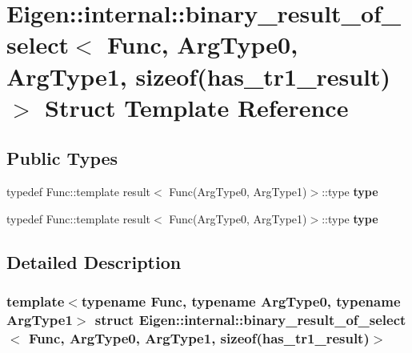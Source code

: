 \hypertarget{struct_eigen_1_1internal_1_1binary__result__of__select_3_01_func_00_01_arg_type0_00_01_arg_type19eb2d03c93e1465fabde3b560e3be1a4}{}\section{Eigen\+:\+:internal\+:\+:binary\+\_\+result\+\_\+of\+\_\+select$<$ Func, Arg\+Type0, Arg\+Type1, sizeof(has\+\_\+tr1\+\_\+result)$>$ Struct Template Reference}
\label{struct_eigen_1_1internal_1_1binary__result__of__select_3_01_func_00_01_arg_type0_00_01_arg_type19eb2d03c93e1465fabde3b560e3be1a4}
\subsection*{Public Types}
\begin{DoxyCompactItemize}
\item 
\mbox{\label{struct_eigen_1_1internal_1_1binary__result__of__select_3_01_func_00_01_arg_type0_00_01_arg_type19eb2d03c93e1465fabde3b560e3be1a4_a3e27d3266b9728c213c35a4e90f1a73d}} 
typedef Func\+::template result$<$ Func(Arg\+Type0, Arg\+Type1)$>$\+::type {\bfseries type}
\item 
\mbox{\label{struct_eigen_1_1internal_1_1binary__result__of__select_3_01_func_00_01_arg_type0_00_01_arg_type19eb2d03c93e1465fabde3b560e3be1a4_a3e27d3266b9728c213c35a4e90f1a73d}} 
typedef Func\+::template result$<$ Func(Arg\+Type0, Arg\+Type1)$>$\+::type {\bfseries type}
\end{DoxyCompactItemize}


\subsection{Detailed Description}
\subsubsection*{template$<$typename Func, typename Arg\+Type0, typename Arg\+Type1$>$\newline
struct Eigen\+::internal\+::binary\+\_\+result\+\_\+of\+\_\+select$<$ Func, Arg\+Type0, Arg\+Type1, sizeof(has\+\_\+tr1\+\_\+result)$>$}



